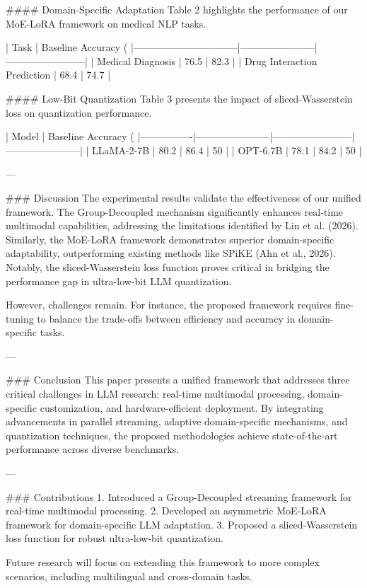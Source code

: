 #### Domain-Specific Adaptation  
Table 2 highlights the performance of our MoE-LoRA framework on medical NLP tasks.  

| Task                           | Baseline Accuracy (%
|--------------------------------|-----------------------|------------------------|  
| Medical Diagnosis              | 76.5                  | 82.3                   |  
| Drug Interaction Prediction    | 68.4                  | 74.7                   |  

#### Low-Bit Quantization  
Table 3 presents the impact of sliced-Wasserstein loss on quantization performance.  

| Model          | Baseline Accuracy (%
|----------------|-----------------------|------------------------|-----------------------|  
| LLaMA-2-7B     | 80.2                  | 86.4                   | 50                    |  
| OPT-6.7B       | 78.1                  | 84.2                   | 50                    |  

---

### Discussion  
The experimental results validate the effectiveness of our unified framework. The Group-Decoupled mechanism significantly enhances real-time multimodal capabilities, addressing the limitations identified by Lin et al. (2026). Similarly, the MoE-LoRA framework demonstrates superior domain-specific adaptability, outperforming existing methods like SPiKE (Ahn et al., 2026). Notably, the sliced-Wasserstein loss function proves critical in bridging the performance gap in ultra-low-bit LLM quantization.  

However, challenges remain. For instance, the proposed framework requires fine-tuning to balance the trade-offs between efficiency and accuracy in domain-specific tasks.  

---

### Conclusion  
This paper presents a unified framework that addresses three critical challenges in LLM research: real-time multimodal processing, domain-specific customization, and hardware-efficient deployment. By integrating advancements in parallel streaming, adaptive domain-specific mechanisms, and quantization techniques, the proposed methodologies achieve state-of-the-art performance across diverse benchmarks.  

---

### Contributions  
1. Introduced a Group-Decoupled streaming framework for real-time multimodal processing.  
2. Developed an asymmetric MoE-LoRA framework for domain-specific LLM adaptation.  
3. Proposed a sliced-Wasserstein loss function for robust ultra-low-bit quantization.  

Future research will focus on extending this framework to more complex scenarios, including multilingual and cross-domain tasks.  